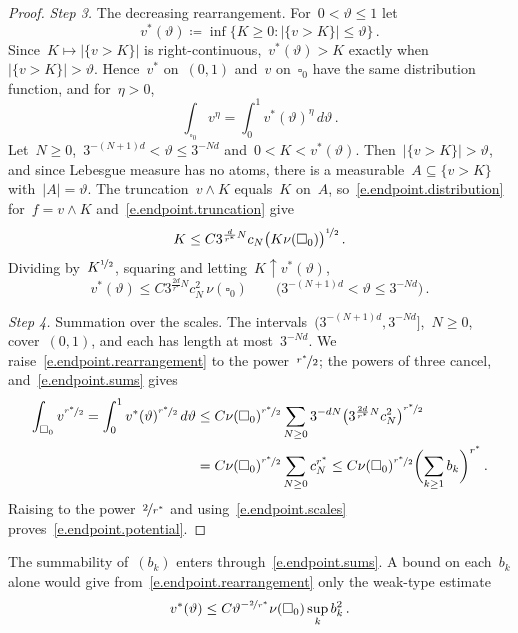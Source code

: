 \documentclass[11pt,letterpaper]{article}
\numberwithin{equation}{section}
\theoremstyle{definition}
\newcommand{\nf}{\nicefrac}
\newcommand{\cu}{\square}
\begin{document}
\begin{proof}
\emph{Step 3.} The decreasing rearrangement. For~$0<\vartheta\leq1$ let
\begin{equation*}
	v^*(\vartheta)\coloneqq\inf\{K\geq0:|\{v>K\}|\leq\vartheta\}\,.
\end{equation*}
Since~$K\mapsto|\{v>K\}|$ is right-continuous,~$v^*(\vartheta)>K$ exactly when~$|\{v>K\}|>\vartheta$. Hence~$v^*$ on~$(0,1)$ and~$v$ on~$\cu_0$ have the same distribution function, and for~$\eta>0$,
\begin{equation*}
	\int_{\cu_0}v^\eta=\int_0^1v^*(\vartheta)^\eta\,d\vartheta\,.
\end{equation*}
Let~$N\geq0$,~$3^{-(N+1)d}<\vartheta\leq3^{-Nd}$ and~$0<K<v^*(\vartheta)$. Then~$|\{v>K\}|>\vartheta$, and since Lebesgue measure has no atoms, there is a measurable~$A\subseteq\{v>K\}$ with~$|A|=\vartheta$. The truncation~$v\wedge K$ equals~$K$ on~$A$, so~\eqref{e.endpoint.distribution} for~$f=v\wedge K$ and~\eqref{e.endpoint.truncation} give
\begin{equation*}
	K\leq C3^{\frac d{r^*}N}c_N\bigl(K\nu(\cu_0)\bigr)^{\nf12}\,.
\end{equation*}
Dividing by~$K^{\nf12}$, squaring and letting~$K\uparrow v^*(\vartheta)$,
\begin{equation}
	v^*(\vartheta)\leq C3^{\frac{2d}{r^*}N}c_N^2\,\nu(\cu_0)\qquad\bigl(3^{-(N+1)d}<\vartheta\leq3^{-Nd}\bigr)\,.
	\label{e.endpoint.rearrangement}
\end{equation}

\smallskip

\emph{Step 4.} Summation over the scales. The intervals~$(3^{-(N+1)d},3^{-Nd}]$,~$N\geq0$, cover~$(0,1)$, and each has length at most~$3^{-Nd}$. We raise~\eqref{e.endpoint.rearrangement} to the power~$\nf{r^*}2$; the powers of three cancel, and~\eqref{e.endpoint.sums} gives
\begin{align*}
	\int_{\cu_0}v^{\nf{r^*}2}=\int_0^1v^*(\vartheta)^{\nf{r^*}2}\,d\vartheta&\leq C\nu(\cu_0)^{\nf{r^*}2}\sum_{N\geq0}3^{-dN}\bigl(3^{\frac{2d}{r^*}N}c_N^2\bigr)^{\nf{r^*}2}\\
	&=C\nu(\cu_0)^{\nf{r^*}2}\sum_{N\geq0}c_N^{r^*}\leq C\nu(\cu_0)^{\nf{r^*}2}\biggl(\sum_{k\geq1}b_k\biggr)^{r^*}\,.
\end{align*}
Raising to the power~$\nf2{r^*}$ and using~\eqref{e.endpoint.scales} proves~\eqref{e.endpoint.potential}.
\end{proof}

The summability of~$(b_k)$ enters through~\eqref{e.endpoint.sums}. A bound on each~$b_k$ alone would give from~\eqref{e.endpoint.rearrangement} only the weak-type estimate
\begin{equation*}
	v^*(\vartheta)\leq C\vartheta^{-\nf2{r^*}}\nu(\cu_0)\sup_kb_k^2\,.
\end{equation*}
\end{document}
